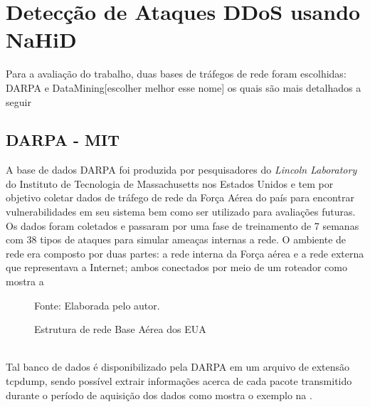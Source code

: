 \section{Detecção de Ataques DDoS usando NaHiD}
\label{Sec:NaHiD_VERC}
Para a avaliação do trabalho, duas bases de tráfegos de rede foram escolhidas: DARPA e  DataMining[escolher melhor esse nome] os quais são mais detalhados a seguir 
\subsection{DARPA - MIT}
 A base de dados DARPA foi produzida por pesquisadores do \textit{Lincoln Laboratory} do Instituto de Tecnologia de Massachusetts nos Estados Unidos e tem por objetivo coletar dados de tráfego de rede da Força Aérea do país para encontrar vulnerabilidades em seu sistema bem como ser utilizado para avaliações futuras. Os dados foram coletados e passaram por uma fase de treinamento de 7 semanas com 38 tipos de ataques para simular ameaças internas a rede. O ambiente de rede era composto por duas partes: a rede interna da Força aérea e a rede externa que representava a Internet; ambos conectados por meio de um roteador como mostra a 
 \begin{figure}[!htb]
	\caption{Estrutura de rede Base Aérea dos EUA }
	{Fonte: Elaborada pelo autor.}
	\label{fig:DARPA_Estrututra}
\end{figure}
\\
Tal banco de dados é disponibilizado pela DARPA em um arquivo de extensão tcpdump, sendo possível extrair informações acerca de cada pacote transmitido durante o período de aquisição dos dados como mostra o exemplo na .

